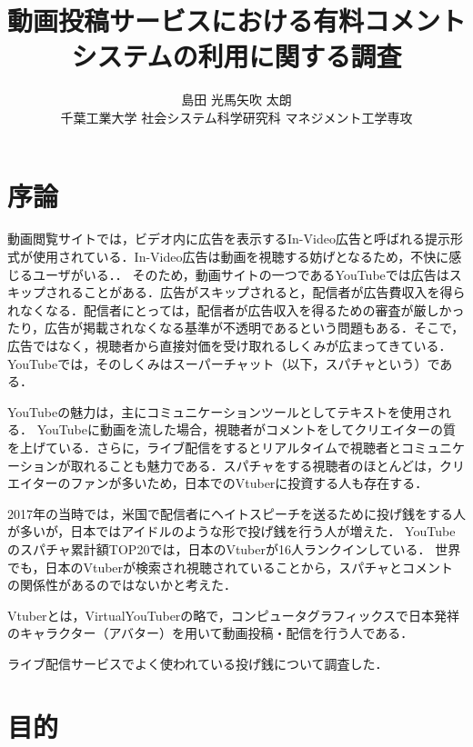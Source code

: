 \documentclass[uplatex,twocolumn]{jsarticle}
\title{\vspace{-10mm}動画投稿サービスにおける有料コメントシステムの利用に関する調査\footnotemark[0]}
\author{\large{島田 光馬\footnotemark[2]\qquad 矢吹 太朗}\\千葉工業大学 社会システム科学研究科 マネジメント工学専攻\footnotemark[3]}
\date{}
\begin{document}
\twocolumn[\maketitle]

\begingroup
\def\thefootnote{\fnsymbol{footnote}}
\endgroup

\section{序論}

動画閲覧サイトでは，ビデオ内に広告を表示するIn-Video広告と呼ばれる提示形式が使用されている．In-Video広告は動画を視聴する妨げとなるため，不快に感じるユーザがいる\cite{01}．．
そのため，動画サイトの一つであるYouTubeでは広告はスキップされることがある．広告がスキップされると，配信者が広告費収入を得られなくなる．配信者にとっては，配信者が広告収入を得るための審査が厳しかったり，広告が掲載されなくなる基準が不透明であるという問題もある．そこで，広告ではなく，視聴者から直接対価を受け取れるしくみが広まってきている．YouTubeでは，そのしくみはスーパーチャット（以下，スパチャという）である．


YouTubeの魅力は，主にコミュニケーションツールとしてテキストを使用される\cite{02}．
YouTubeに動画を流した場合，視聴者がコメントをしてクリエイターの質を上げている．さらに，ライブ配信をするとリアルタイムで視聴者とコミュニケーションが取れることも魅力である．スパチャをする視聴者のほとんどは，クリエイターのファンが多いため，日本でのVtuberに投資する人も存在する．

2017年の当時では，米国で配信者にヘイトスピーチを送るために投げ銭をする人が多いが，日本ではアイドルのような形で投げ銭を行う人が増えた．
YouTubeのスパチャ累計額TOP20では，日本のVtuberが16人ランクインしている\cite{03}．
世界でも，日本のVtuberが検索され視聴されていることから，スパチャとコメントの関係性があるのではないかと考えた．

Vtuberとは，VirtualYouTuberの略で，コンピュータグラフィックスで日本発祥のキャラクター（アバター）を用いて動画投稿・配信を行う人である．

ライブ配信サービスでよく使われている投げ銭について調査した．


\section{目的}
\end{document}
